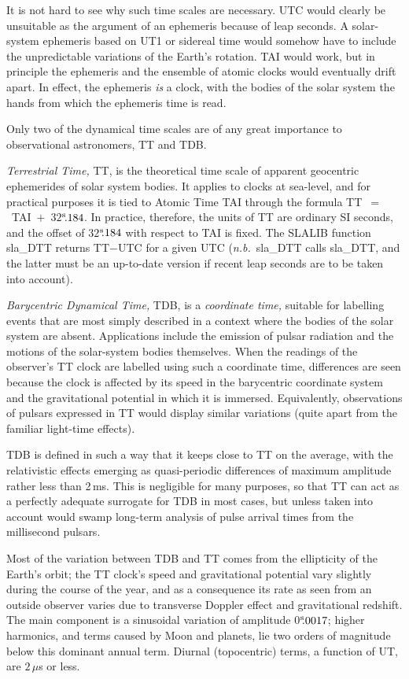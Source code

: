 \documentclass[11pt,twoside,nolof]{starlink}
\providecommand{\tseci}[1]   {$#1$\mbox{$^{\rm s}$}}
\providecommand{\tsec}[2]    {\tseci{#1}$\hspace{-0.3em}.#2$}
\begin{document}
It is not hard to see why such time scales are necessary.
UTC would clearly be unsuitable as the argument of an
ephemeris because of leap seconds.
A solar-system ephemeris based on UT1 or sidereal time would somehow
have to include the unpredictable variations of the Earth's rotation.
TAI would work, but in principle
the ephemeris and the ensemble of atomic clocks would
eventually drift apart.
In effect, the ephemeris \textit{is}\/ a clock, with the bodies of
the solar system the hands from which the ephemeris time is read.

Only two of the dynamical time scales are of any great importance to
observational astronomers, TT and TDB.

\textit{Terrestrial Time,} TT, is
the theoretical time scale of apparent geocentric ephemerides of solar
system bodies.  It applies to clocks at sea-level, and for practical purposes
it is tied to
Atomic Time TAI through the formula TT~$=$~TAI~$+$~\tsec{32}{184}.
In practice, therefore, the units of TT are ordinary SI seconds, and
the offset of \tsec{32}{184} with respect to TAI is fixed.
The SLALIB function
sla\_DTT
returns TT$-$UTC for a given UTC
(\textit{n.b.}~sla\_DTT
calls
sla\_DTT,
and the latter must be an up-to-date version if recent leap seconds are
to be taken into account).

\textit{Barycentric Dynamical Time,} TDB, is a
\textit{coordinate time,} suitable
for labelling events that are most simply described in a context
where the bodies of the solar system
are absent.  Applications include
the emission of pulsar radiation and the motions of the
solar-system bodies themselves.  When the readings of the
observer's TT clock are labelled using such a
coordinate time, differences
are seen because the clock is affected by its
speed in the barycentric coordinate system
and the gravitational potential in which it is immersed.  Equivalently,
observations of pulsars
expressed in TT would display similar variations (quite
apart from the familiar light-time effects).

TDB is defined in such a way that it keeps close to TT
on the average, with the relativistic effects emerging as
quasi-periodic differences of maximum amplitude rather less
than 2\,ms.  This is
negligible for many purposes, so that TT can act as
a perfectly adequate surrogate for TDB in most cases,
but unless taken into
account would swamp
long-term analysis of pulse arrival times from the
millisecond pulsars.

Most of the variation between TDB and TT comes from the ellipticity of
the Earth's orbit;  the TT clock's speed and
gravitational potential vary slightly
during the course of the year, and as a consequence
its rate as seen from an outside observer
varies due to transverse Doppler effect and gravitational
redshift.  The main component is a sinusoidal variation of
amplitude \tsec{0}{0017};  higher harmonics, and terms
caused by Moon and planets, lie two orders of magnitude below
this dominant annual term.  Diurnal (topocentric) terms, a
function of UT, are $2\,\mu$s or less.
\end{document}
